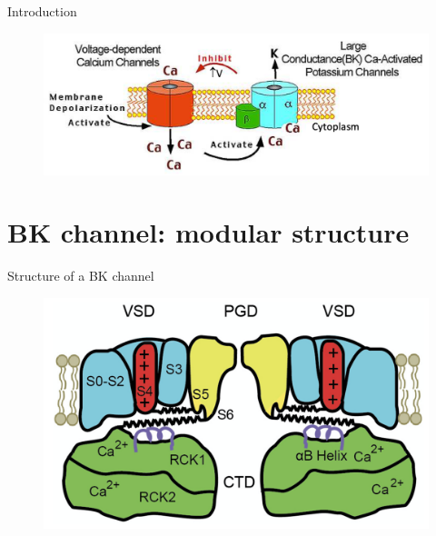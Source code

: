 \documentclass{beamer}
\begin{document}
\begin{frame}{Introduction}
\begin{figure}
\centering
\includegraphics[width=.8\textwidth]{Feedback_Mechanism.png}
\end{figure}
\end{frame}

\section{BK channel: modular structure}

\begin{frame}{Structure of a BK channel}
\begin{figure}
\centering
\includegraphics[width=.8\textwidth]{BK_Cartoon.png}
\end{figure}
\hfill
\end{frame}
\end{document}
